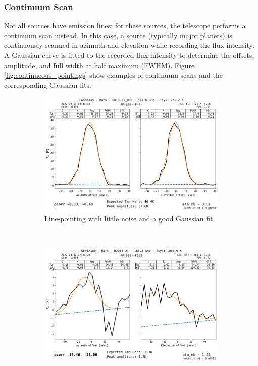 \subsubsection{Continuum Scan}
Not all sources have emission lines; for these sources, the telescope performs a continuum scan instead.
In this case, a source (typically major planets) is continuously scanned in azimuth and elevation while recording the flux intensity.
A Gaussian curve is fitted to the recorded flux intensity to determine the offsets, amplitude, and full width at half maximum (FWHM).
Figure \ref{fig:continueous_pointings} show examples of continuum scans and the corresponding Gaussian fits.

\begin{figure}[H]
    \centering
     \begin{subfigure}[b]{0.75\textwidth}
         \centering
         \includegraphics[width=\textwidth]{Pointing Scans/good_continuous.png}
         \caption{Line-pointing with little noise and a good Gaussian fit.}
         \label{subfig:good_continuous}
     \end{subfigure}
    \\
     \begin{subfigure}[b]{0.75\textwidth}
         \centering
         \includegraphics[width=\textwidth]{Pointing Scans/bad_continuous.png}

\end{subfigure}
\end{figure}
